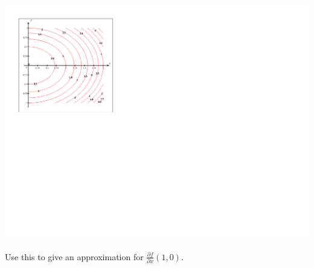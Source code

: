 \documentclass[12pt]{article}
\newif\ifans
\begin{document}
\begin{enumerate}
\begin{center}
\includegraphics[scale=1]{contour.pdf}
\end{center}

Use this to give an approximation for $\frac{\partial f}{\partial x}(1,0)$.

\ifans{\fbox{\parbox{1\linewidth}{The slope is approximately 2.  Note: You should use the level curve which passes through $(1,0)$ as well as one which is close to $(1,0)$ to \underline{estimate} the slope.}}} \fi

\end{enumerate}
\end{document}
